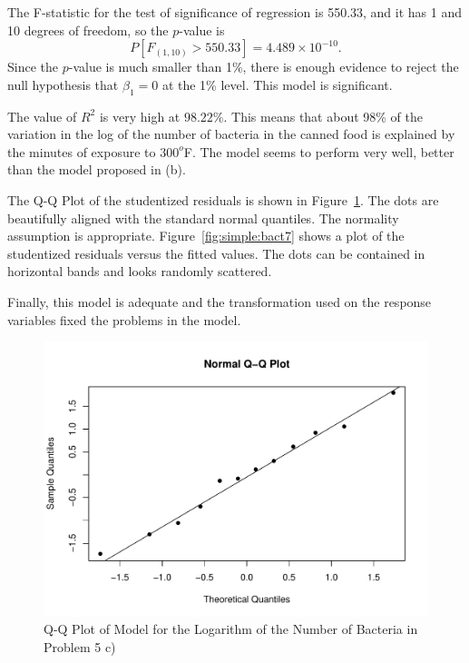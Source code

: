 \begin{solution}{2.22}
\begin{enumerate}
The F-statistic for the test of significance of regression is 550.33, and it has 1 and 10 degrees of freedom, so the $p$-value is $$P[F_{(1,10)}>550.33]= 4.489\times10^{-10}.$$ Since the $p$-value is much smaller than 1\%, there is enough evidence to reject the null hypothesis that $\beta_{1}=0$ at the 1\% level. This model is significant.

The value of $R^{2}$ is very high at $98.22\%$. This means that about 98\% of the variation in the log of the number of bacteria in the canned food is explained by the minutes of exposure to $300^{o}$F. The model seems to perform very well, better than the model proposed in (b).

The Q-Q Plot of the studentized residuals is shown in Figure~\ref{fig:simple:bact6}. The dots are beautifully aligned with the standard normal quantiles. The normality assumption is appropriate. Figure~\ref{fig:simple:bact7} shows a plot of the studentized residuals versus the fitted values. The dots can be contained in horizontal bands and looks randomly scattered.

Finally, this model is adequate and the transformation used on the response variables fixed the problems in the model.

\begin{figure}
\begin{center}
\begin{knitrout}
\color{fgcolor}
\includegraphics[width=\maxwidth]{figure/unnamed-chunk-46-1}

\end{knitrout}
\end{center}
\caption{Q-Q Plot of Model for the Logarithm of the Number of Bacteria in Problem 5 c)} \label{fig:simple:bact6}
\end{figure}


\end{enumerate}
\end{solution}
